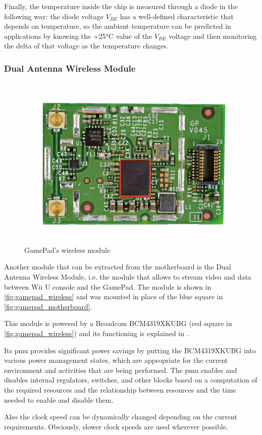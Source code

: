 \documentclass[11pt,a4paper,titlepage]{article}
\begin{document}
			Finally, the temperature inside the chip is measured through a diode in the following way: the diode voltage $V_{BE}$ has a well-defined characteristic that depends on temperature, so the ambient temperature can be predicted in applications by knowing the +25°C value of the $V_{BE}$ voltage and then monitoring the delta of that voltage as the temperature changes.
			\newpage

		\subsubsection{Dual Antenna Wireless Module}
			\begin{figure}[htbp]
				\centering
				\includegraphics[width=.6\textwidth]{dual_antenna_wireless1.png}
				\caption{GamePad's wireless module}
				\label{fig:gamepad_wireless}
			\end{figure}
			Another module that can be extracted from the motherboard is the Dual Antenna Wireless Module, i.e. the module that allows to stream video and data between Wii U console and the GamePad. The module is shown in \autoref{fig:gamepad_wireless} and was mounted in place of the blue square in \autoref{fig:gamepad_motherboard}.

			This module is powered by a Broadcom BCM4319XKUBG (red square in \autoref{fig:gamepad_wireless}) and its functioning is explained in \cite{broadcom_wireless}.

			Its \gls{pmu} provides significant power savings by putting the BCM4319XKUBG into various power management states, which are appropriate for the current environment and activities that are being performed. The \gls{pmu} enables and disables internal regulators, switches, and other blocks based on a computation of the required resources and the relationship between resources and the time needed to enable and disable them.

			Also the clock speed can be dynamically changed depending on the current requirements. Obviously, slower clock speeds are used wherever possible.
\end{document}
